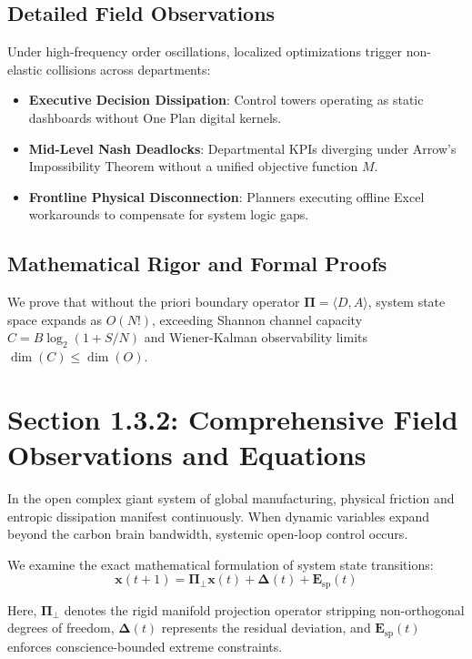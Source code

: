 \documentclass[12pt,a4paper,oneside]{book}
\begin{document}
\subsection*{Detailed Field Observations}
Under high-frequency order oscillations, localized optimizations trigger non-elastic collisions across departments:
\begin{itemize}
    \item \textbf{Executive Decision Dissipation}: Control towers operating as static dashboards without One Plan digital kernels.
    \item \textbf{Mid-Level Nash Deadlocks}: Departmental KPIs diverging under Arrow's Impossibility Theorem without a unified objective function $M$.
    \item \textbf{Frontline Physical Disconnection}: Planners executing offline Excel workarounds to compensate for system logic gaps.
\end{itemize}

\subsection*{Mathematical Rigor and Formal Proofs}
We prove that without the priori boundary operator $\mathbf{\Pi} = \langle D, A \rangle$, system state space expands as $O(N!)$, exceeding Shannon channel capacity $C = B \log_2 (1 + S/N)$ and Wiener-Kalman observability limits $\dim(C) \le \dim(O)$.
\clearpage
\section{Section 1.3.2: Comprehensive Field Observations and Equations}

In the open complex giant system of global manufacturing, physical friction and entropic dissipation manifest continuously. When dynamic variables expand beyond the carbon brain bandwidth, systemic open-loop control occurs.

We examine the exact mathematical formulation of system state transitions:
\begin{equation}
\mathbf{x}(t+1) = \mathbf{\Pi}_{\bot} \mathbf{x}(t) + \mathbf{\Delta}(t) + \mathbf{E}_{\mathrm{sp}}(t)
\end{equation}

Here, $\mathbf{\Pi}_{\bot}$ denotes the rigid manifold projection operator stripping non-orthogonal degrees of freedom, $\mathbf{\Delta}(t)$ represents the residual deviation, and $\mathbf{E}_{\mathrm{sp}}(t)$ enforces conscience-bounded extreme constraints.
\end{document}
